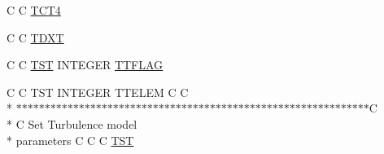 \begin{DoxyCompactItemize}
\item 
C C \hyperlink{home_2abonfi_2_c_f_d__codes_2_eul_f_s_83_84_2include_2turb_8com_a1f51e8ca66b410b1ce1046689d2e332f}{T\-C\-T4}
\item 
C C \hyperlink{home_2abonfi_2_c_f_d__codes_2_eul_f_s_83_84_2include_2turb_8com_af243bf8446092716e2b3ec512084875a}{T\-D\-X\-T}
\item 
C C \hyperlink{msa20_2home_2abonfi_2_c_f_d__codes_2_eul_f_s_83_82_83_2include_2turb_8com_a677fc6bb107acfd381357f761464b300}{T\-S\-T} I\-N\-T\-E\-G\-E\-R \hyperlink{home_2abonfi_2_c_f_d__codes_2_eul_f_s_83_84_2include_2turb_8com_ab410312bc7ffadaca38025fc3fe530a8}{T\-T\-F\-L\-A\-G}
\item 
C C T\-S\-T I\-N\-T\-E\-G\-E\-R T\-T\-E\-L\-E\-M C C \\*
$\ast$$\ast$$\ast$$\ast$$\ast$$\ast$$\ast$$\ast$$\ast$$\ast$$\ast$$\ast$$\ast$$\ast$$\ast$$\ast$$\ast$$\ast$$\ast$$\ast$$\ast$$\ast$$\ast$$\ast$$\ast$$\ast$$\ast$$\ast$$\ast$$\ast$$\ast$$\ast$$\ast$$\ast$$\ast$$\ast$$\ast$$\ast$$\ast$$\ast$$\ast$$\ast$$\ast$$\ast$$\ast$$\ast$$\ast$$\ast$$\ast$$\ast$$\ast$$\ast$$\ast$$\ast$$\ast$$\ast$$\ast$$\ast$$\ast$$\ast$$\ast$$\ast$C \\*
C Set Turbulence model \\*
parameters C C C \hyperlink{home_2abonfi_2_c_f_d__codes_2_eul_f_s_83_84_2include_2turb_8com_a677fc6bb107acfd381357f761464b300}{T\-S\-T}
\end{DoxyCompactItemize}


